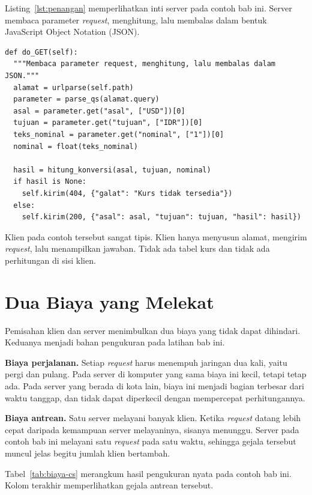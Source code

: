 Listing~\ref{lst:penangan} memperlihatkan inti server pada contoh bab ini.
Server membaca parameter \textit{request}, menghitung, lalu membalas dalam bentuk
JavaScript Object Notation (JSON).

\begin{lstlisting}[style=PythonStyle, caption={Penanganan satu \textit{request} pada
  server, tersedia di \berkas{sources/chapter01/server.py}}, label=lst:penangan]
def do_GET(self):
  """Membaca parameter request, menghitung, lalu membalas dalam JSON."""
  alamat = urlparse(self.path)
  parameter = parse_qs(alamat.query)
  asal = parameter.get("asal", ["USD"])[0]
  tujuan = parameter.get("tujuan", ["IDR"])[0]
  teks_nominal = parameter.get("nominal", ["1"])[0]
  nominal = float(teks_nominal)

  hasil = hitung_konversi(asal, tujuan, nominal)
  if hasil is None:
    self.kirim(404, {"galat": "Kurs tidak tersedia"})
  else:
    self.kirim(200, {"asal": asal, "tujuan": tujuan, "hasil": hasil})
\end{lstlisting}

Klien pada contoh tersebut sangat tipis. Klien hanya menyusun alamat, mengirim
\textit{request}, lalu menampilkan jawaban. Tidak ada tabel kurs dan tidak ada
perhitungan di sisi klien.

\section{Dua Biaya yang Melekat}

Pemisahan klien dan server menimbulkan dua biaya yang tidak dapat dihindari.
Keduanya menjadi bahan pengukuran pada latihan bab ini.

\textbf{Biaya perjalanan.} Setiap \textit{request} harus menempuh jaringan dua kali,
yaitu pergi dan pulang. Pada server di komputer yang sama biaya ini kecil, tetapi
tetap ada. Pada server yang berada di kota lain, biaya ini menjadi bagian
terbesar dari waktu tanggap, dan tidak dapat diperkecil dengan mempercepat
perhitungannya.

\textbf{Biaya antrean.} Satu server melayani banyak klien. Ketika \textit{request}
datang lebih cepat daripada kemampuan server melayaninya, sisanya menunggu.
Server pada contoh bab ini melayani satu \textit{request} pada satu waktu, sehingga
gejala tersebut muncul jelas begitu jumlah klien bertambah.

Tabel~\ref{tab:biaya-cs} merangkum hasil pengukuran nyata pada contoh bab ini.
Kolom terakhir memperlihatkan gejala antrean tersebut.


